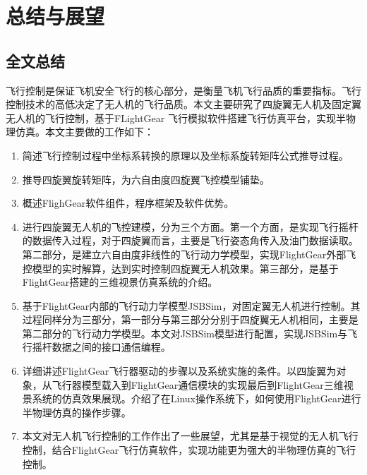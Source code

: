 ﻿%
%
%

\renewcommand{\baselinestretch}{1.5}
\fontsize{12pt}{13pt}\selectfont

\chapter{总结与展望}\label{conclusion}
\section{全文总结}
飞行控制是保证飞机安全飞行的核心部分，是衡量飞机飞行品质的重要指标。飞行控制技术的高低决定了无人机的飞行品质。本文主要研究了四旋翼无人机及固定翼无人机的飞行控制，基于FLightGear 飞行模拟软件搭建飞行仿真平台，实现半物理仿真。本文主要做的工作如下：
\vspace{-10pt}
\begin{enumerate}
	\item 简述飞行控制过程中坐标系转换的原理以及坐标系旋转矩阵公式推导过程。
	\item 推导四旋翼旋转矩阵，为六自由度四旋翼飞控模型铺垫。
	\item 概述FlighGear软件组件，程序框架及软件优势。
	\item 进行四旋翼无人机的飞控建模，分为三个方面。第一个方面，是实现飞行摇杆的数据传入过程，对于四旋翼而言，主要是飞行姿态角传入及油门数据读取。第二部分，是建立六自由度非线性的飞行动力学模型，实现FlightGear外部飞控模型的实时解算，达到实时控制四旋翼无人机效果。第三部分，是基于FlightGear搭建的三维视景仿真系统的介绍。
	\item 基于FlightGear内部的飞行动力学模型JSBSim，对固定翼无人机进行控制。其过程同样分为三部分，第一部分与第三部分分别于四旋翼无人机相同，主要是第二部分的飞行动力学模型。本文对JSBSim模型进行配置，实现JSBSim与飞行摇杆数据之间的接口通信编程。
	\item 详细讲述FlightGear飞行器驱动的步骤以及系统实施的条件。以四旋翼为对象，从飞行器模型载入到FlightGear通信模块的实现最后到FlightGear三维视景系统的仿真效果展现。介绍了在Linux操作系统下，如何使用FlightGear进行半物理仿真的操作步骤。
	\item 本文对无人机飞行控制的工作作出了一些展望，尤其是基于视觉的无人机飞行控制，结合FlightGear飞行仿真软件，实现功能更为强大的半物理仿真的飞行控制。
\end{enumerate}

